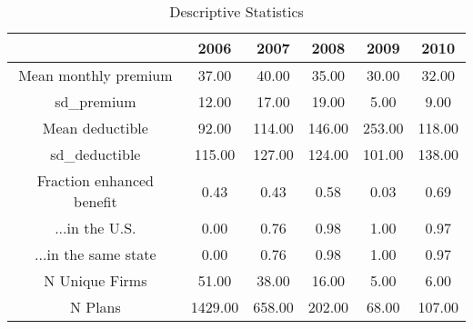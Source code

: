 \begin{table}[ht]
\centering
\begin{tabular}{cccccc}
  \hline
 & 2006 & 2007 & 2008 & 2009 & 2010 \\ 
  \hline
Mean monthly premium & 37.00 & 40.00 & 35.00 & 30.00 & 32.00 \\ 
  sd\_premium & 12.00 & 17.00 & 19.00 & 5.00 & 9.00 \\ 
  Mean deductible & 92.00 & 114.00 & 146.00 & 253.00 & 118.00 \\ 
  sd\_deductible & 115.00 & 127.00 & 124.00 & 101.00 & 138.00 \\ 
  Fraction enhanced benefit & 0.43 & 0.43 & 0.58 & 0.03 & 0.69 \\ 
  ...in the U.S. & 0.00 & 0.76 & 0.98 & 1.00 & 0.97 \\ 
  ...in the same state & 0.00 & 0.76 & 0.98 & 1.00 & 0.97 \\ 
  N Unique Firms & 51.00 & 38.00 & 16.00 & 5.00 & 6.00 \\ 
  N Plans & 1429.00 & 658.00 & 202.00 & 68.00 & 107.00 \\ 
   \hline
\end{tabular}
\caption{Descriptive Statistics}
\label{tab:descstat}
\end{table}

